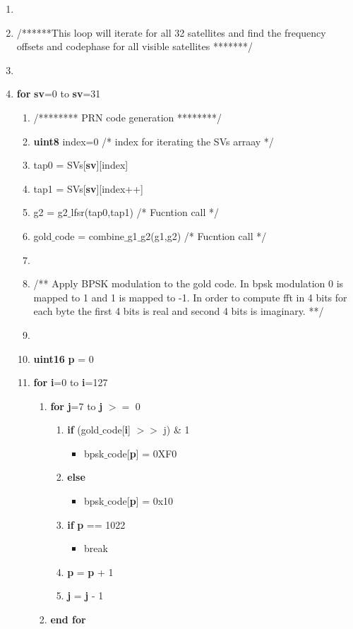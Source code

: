 \documentclass[journal,10pt,onecolumn]{article}
\begin{document}
\begin{itemize}
\begin{enumerate}
    \item[]
    \item[] /******This loop will iterate for all 32 satellites and find the frequency offsets and codephase for all visible satellites *******/
    \item[] 
    \item[] \textbf{for} \textbf{sv}=0 to \textbf{sv}=31
	\begin{enumerate}
        \item[] /******** PRN code generation ********/
        \item[] \textbf{uint8} index=0    \hspace{5mm} /* index for iterating the SVs arraay */ 
        \item[] tap0 = SVs[\textbf{sv}][index]
        \item[] tap1 = SVs[\textbf{sv}][index++]
        \item[] g2 = g2$\_$lfsr(tap0,tap1)   /* Fucntion call */
        \item[] gold$\_$code = combine$\_$g1$\_$g2(g1,g2)  /* Fucntion call */
        \item[]
        \item[]  /** Apply BPSK modulation to the gold code. In bpsk modulation 0 is mapped to 1 and 1 is mapped to -1. In order to compute fft in 4 bits for each byte the first 4 bits is real and second 4 bits is imaginary. **/
        \item[]
        \item[] \textbf{uint16} \textbf{p} = 0
        \item[] \textbf{for} \textbf{i}=0 to \textbf{i}=127
        \begin{enumerate}
            \item[] \textbf{for} \textbf{j}=7 to \textbf{j} $>=$ 0
            \begin{enumerate}
                \item[] \textbf{if} (gold$\_$code[\textbf{i}] $>>$ j) \& 1
                \begin{itemize}
                    \item[] bpsk$\_$code[\textbf{p}] = 0XF0
                \end{itemize}
                \item[] \textbf{else}
                \begin{itemize}
                    \item[] bpsk$\_$code[\textbf{p}] = 0x10
                \end{itemize}
                \item[] \textbf{if} \textbf{p} == 1022
                \begin{itemize}
                    \item[] break
                \end{itemize}
                \item[] \textbf{p} = \textbf{p} + 1
                \item[] \textbf{j} = \textbf{j} - 1
            \end{enumerate}
            \item[] \textbf{end for}


\end{enumerate}
\end{enumerate}
\end{enumerate}
\end{itemize}
\end{document}
